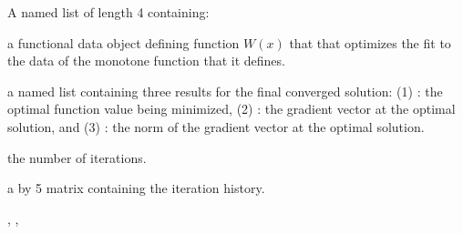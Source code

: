 \begin{Value}
A named list of length 4 containing:

\begin{ldescription}
\item[\code{Wfdobj}] a functional data object defining function $W(x)$ that that
optimizes the fit to the data of the monotone function that it
defines.

\item[\code{Flist}] a named list containing three results for the final converged
solution: (1) : the optimal function value being minimized,
(2) : the gradient vector at the optimal solution, and
(3) : the norm of the gradient vector at the optimal
solution.

\item[\code{iternum}] the number of iterations.

\item[\code{iterhist}] a \code{} by 5 matrix containing the iteration history.

\end{ldescription}
\end{Value}
\begin{SeeAlso}\relax
{},
,
\end{SeeAlso}


